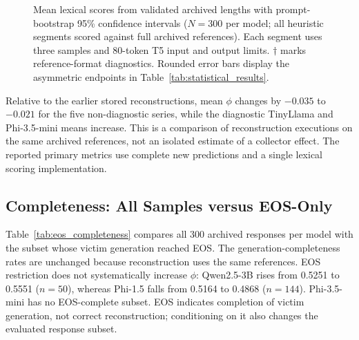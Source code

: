 \documentclass[electronics,article,submit,pdftex,moreauthors]{Definitions/mdpi}
\begin{document}
\begin{figure}[ht]
\centering
{}
\caption{Mean lexical scores from validated archived lengths with prompt-bootstrap 95\% confidence intervals ($N=300$ per model; all heuristic segments scored against full archived references). Each segment uses three samples and 80-token T5 input and output limits. $\dagger$ marks reference-format diagnostics. Rounded error bars display the asymmetric endpoints in Table~\ref{tab:statistical_results}.}
\label{fig:model_ci}
\end{figure}

Relative to the earlier stored reconstructions, mean $\phi$ changes by $-0.035$ to $-0.021$ for the five non-diagnostic series, while the diagnostic TinyLlama and Phi-3.5-mini means increase. This is a comparison of reconstruction executions on the same archived references, not an isolated estimate of a collector effect. The reported primary metrics use complete new predictions and a single lexical scoring implementation.

\subsection{Completeness: All Samples versus EOS-Only}
Table~\ref{tab:eos_completeness} compares all 300 archived responses per model with the subset whose victim generation reached EOS. The generation-completeness rates are unchanged because reconstruction uses the same references. EOS restriction does not systematically increase $\phi$: Qwen2.5-3B rises from 0.5251 to 0.5551 ($n=50$), whereas Phi-1.5 falls from 0.5164 to 0.4868 ($n=144$). Phi-3.5-mini has no EOS-complete subset. EOS indicates completion of victim generation, not correct reconstruction; conditioning on it also changes the evaluated response subset.
\end{document}

